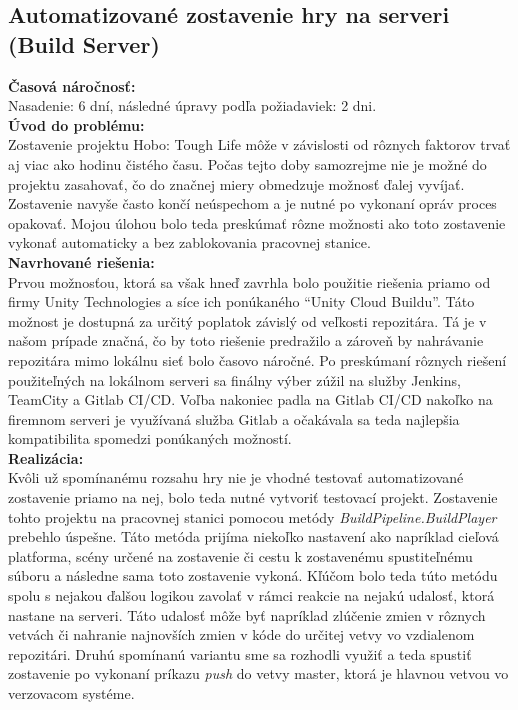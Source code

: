 \documentclass[slovak, bachelorpractice]{diploma}
\begin{document}
\subsection{Automatizované zostavenie hry na serveri (Build Server)}
\label{sec:BuildServer}
\textbf{Časová náročnosť:} \\ Nasadenie: 6 dní, následné úpravy podľa požiadaviek: 2 dni.\\
\textbf{Úvod do problému:} \\ Zostavenie projektu Hobo: Tough Life môže v závislosti od rôznych faktorov trvať aj viac ako hodinu čistého času. Počas tejto doby samozrejme nie je možné do projektu zasahovať, čo do značnej miery obmedzuje možnosť ďalej vyvíjať. Zostavenie navyše často končí neúspechom a je nutné po vykonaní opráv proces opakovať. Mojou úlohou bolo teda preskúmať rôzne možnosti ako toto zostavenie vykonať automaticky a bez zablokovania pracovnej stanice. \\
\textbf{Navrhované riešenia:} \\ Prvou možnosťou, ktorá sa však hneď zavrhla bolo použitie riešenia priamo od firmy Unity Technologies a síce ich ponúkaného \enquote{Unity Cloud Buildu}. Táto možnost je dostupná za určitý poplatok závislý od veľkosti repozitára. Tá je v našom prípade značná, čo by toto riešenie predražilo a zároveň by nahrávanie repozitára mimo lokálnu sieť bolo časovo náročné. Po preskúmaní rôznych riešení použiteľných na lokálnom serveri sa finálny výber zúžil na služby Jenkins, TeamCity a Gitlab \mbox{CI/CD}. Voľba nakoniec padla na Gitlab CI/CD nakoľko na firemnom serveri je využívaná služba Gitlab a očakávala sa teda najlepšia kompatibilita spomedzi ponúkaných možností.\\
\textbf{Realizácia:} \\ Kvôli už spomínanému rozsahu hry nie je vhodné testovať automatizované zostavenie priamo na nej, bolo teda nutné vytvoriť testovací projekt. Zostavenie tohto projektu na pracovnej stanici pomocou metódy \textit{BuildPipeline.BuildPlayer} prebehlo úspešne. Táto metóda prijíma niekoľko nastavení ako napríklad cieľová platforma, scény určené na zostavenie či cestu k zostavenému spustiteľnému súboru a následne sama toto zostavenie vykoná. Kľúčom bolo teda túto metódu spolu s nejakou ďalšou logikou zavolať v rámci reakcie na nejakú udalosť, ktorá nastane na serveri. Táto udalosť môže byť napríklad zlúčenie zmien v rôznych vetvách či nahranie najnovších zmien v kóde do určitej vetvy vo vzdialenom repozitári. Druhú spomínanú variantu sme sa rozhodli využiť a teda spustiť zostavenie po vykonaní príkazu \textit{push} do vetvy master, ktorá je hlavnou vetvou vo verzovacom systéme.
\end{document}
